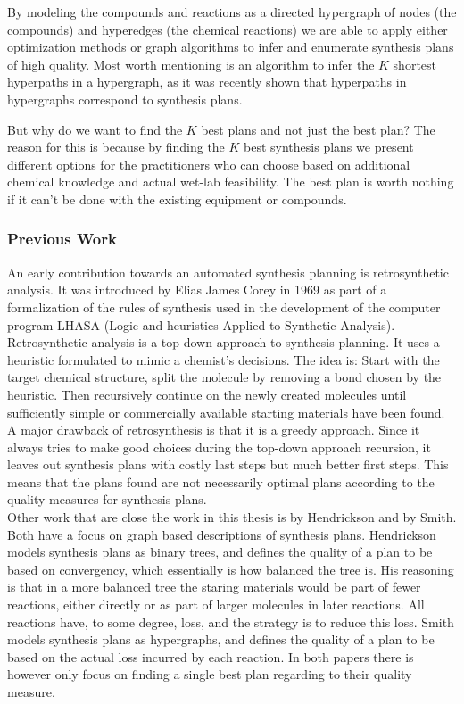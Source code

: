 \documentclass[a4paper,10pt,titlepage]{paper}
\begin{document}
By modeling the compounds and reactions as a directed hypergraph of nodes (the compounds) and hyperedges (the chemical reactions) we are able to apply either optimization methods or graph algorithms to infer and enumerate synthesis plans of high quality. Most worth mentioning is an algorithm to infer the $K$ shortest hyperpaths in a hypergraph, as it was recently shown \cite{Nielsen} that hyperpaths in hypergraphs correspond to synthesis plans.

But why do we want to find the $K$ best plans and not just the best plan? The reason for this is because by finding the $K$ best synthesis plans we present different options for the practitioners who can choose based on additional chemical knowledge and actual wet-lab feasibility. The best plan is worth nothing if it can't be done with the existing equipment or compounds.
\subsubsection*{Previous Work}
An early contribution towards an automated synthesis planning is retrosynthetic analysis. It was introduced by Elias James Corey in 1969 as part of a formalization of the rules of synthesis used in the development of the computer program LHASA (Logic and heuristics Applied to Synthetic Analysis)\cite{Corey}. Retrosynthetic analysis is a top-down approach to synthesis planning. It uses a heuristic formulated to mimic a chemist's decisions. The idea is: Start with the target chemical structure, split the molecule by removing a bond chosen by the heuristic. Then recursively continue on the newly created molecules until sufficiently simple or commercially available starting materials have been found. A major drawback of retrosynthesis is that it is a greedy approach. Since it always tries to make good choices during the top-down approach recursion, it leaves out synthesis plans with costly last steps but much better first steps. This means that the plans found are not necessarily optimal plans according to the quality measures for synthesis plans.\cite{Fagerberg}\\
Other work that are close the work in this thesis is by Hendrickson \cite{Hendrickson} and by Smith\cite{Smith}. Both have a focus on graph based descriptions of synthesis plans. Hendrickson models synthesis plans as binary trees, and defines the quality of a plan to be based on convergency, which essentially is how balanced the tree is. His reasoning is that in a more balanced tree the staring materials would be part of fewer reactions, either directly or as part of larger molecules in later reactions. All reactions have, to some degree, loss, and the strategy is to reduce this loss. Smith models synthesis plans as hypergraphs, and defines the quality of a plan to be based on the actual loss incurred by each reaction. In both papers there is however only focus on finding a single best plan regarding to their quality measure.\cite{Fagerberg}
\end{document}
